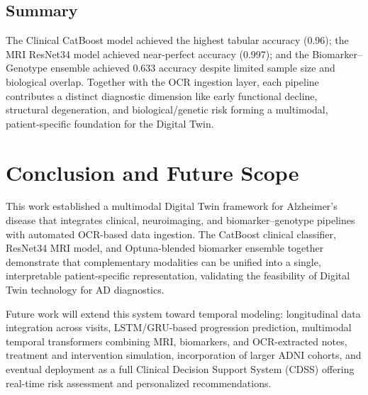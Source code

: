 \documentclass[conference]{IEEEtran}
\begin{document}
\subsection{Summary}
The Clinical CatBoost model achieved the highest tabular accuracy (0.96); the MRI ResNet34 model achieved near-perfect accuracy (0.997); and the Biomarker--Genotype ensemble achieved 0.633 accuracy despite limited sample size and biological overlap. Together with the OCR ingestion layer, each pipeline contributes a distinct diagnostic dimension like early functional decline, structural degeneration, and biological/genetic risk forming a multimodal, patient-specific foundation for the Digital Twin.

\section{Conclusion and Future Scope}
This work established a multimodal Digital Twin framework for Alzheimer's disease that integrates clinical, neuroimaging, and biomarker--genotype pipelines with automated OCR-based data ingestion. The CatBoost clinical classifier, ResNet34 MRI model, and Optuna-blended biomarker ensemble together demonstrate that complementary modalities can be unified into a single, interpretable patient-specific representation, validating the feasibility of Digital Twin technology for AD diagnostics.

Future work will extend this system toward temporal modeling: longitudinal data integration across visits, LSTM/GRU-based progression prediction, multimodal temporal transformers combining MRI, biomarkers, and OCR-extracted notes, treatment and intervention simulation, incorporation of larger ADNI cohorts, and eventual deployment as a full Clinical Decision Support System (CDSS) offering real-time risk assessment and personalized recommendations.
\end{document}
